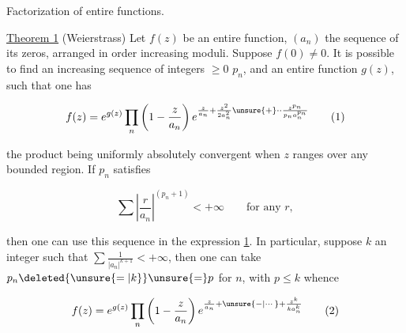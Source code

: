 
Factorization of entire functions.

\uline{Theorem 1} (Weierstrass) Let $f(z)$ be an entire function, $(a_n)$ the sequence of its zeros, arranged in order  increasing moduli. Suppose $f(0)\ne0$. It is possible to find an increasing sequence of integers $\geq0$ $p_n$, and an entire function $g(z)$, such that one has

\[
 f(z)=e^{g(z)}\prod_n\left(1-\frac{z}{a_n}\right)e^{\frac{z}{a_n}+\frac{z^2}{2a_n^2}\unsure{+}\mathord{\cdot}\mathord{\cdot}\frac{z^{p_n}}{p_n a_n^{p_n}}} \tag*{(1)}
\]

the product being uniformly absolutely convergent when $z$ ranges over any bounded region. If   $p_n$ satisfies

\[
 \sum\left|\frac{r}{a_n}\right|^{(p_n+1)}<+\infty\qquad\text{for any }r,
\]

then one can use this sequence in the expression \uline{1}. In particular, suppose $k$ an integer such that $\sum\frac{1}{|a_n|^{k+1}}<+\infty$, then one can take $p_n\deleted{\unsure{=|k}}\unsure{=}p$ for  $n$, with $p\leq k$ whence

\[
 f(z)=e^{g(z)}\prod_n\left(1-\frac{z}{a_n}\right)e^{\frac{z}{a_n}+\unsure{-|\cdots}+\frac{z^k}{ka_n^k}} \tag*{(2)}
\]

